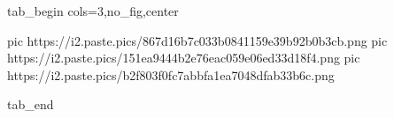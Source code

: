  
 
 
 
 


\ifcmt
  tab_begin cols=3,no_fig,center

     pic https://i2.paste.pics/867d16b7c033b0841159e39b92b0b3cb.png
		 pic https://i2.paste.pics/151ea9444b2e76eac059e06ed33d18f4.png
		 pic https://i2.paste.pics/b2f803f0fc7abbfa1ea7048dfab33b6c.png

  tab_end
\fi
